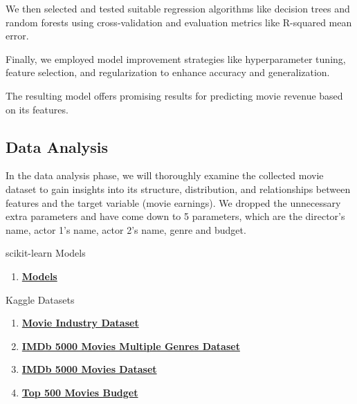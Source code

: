 \documentclass[conference]{IEEEtran}
\begin{document}
    We then selected and tested suitable regression algorithms like decision trees and random forests using cross-validation and evaluation metrics like R-squared mean error.

    Finally, we employed model improvement strategies like hyperparameter tuning, feature selection, and regularization to enhance accuracy and generalization.

    The resulting model offers promising results for predicting movie revenue based on its features.

    \subsection{Data Analysis}
    In the data analysis phase, we will thoroughly examine the collected movie dataset to gain insights into its structure, distribution, and relationships between features and the target variable (movie earnings). We dropped the unnecessary extra parameters and have come down to 5 parameters, which are the director's name, actor 1's name, actor 2's name, genre and budget.

\begin{thebibliography}{1}
     scikit-learn Models
    \begin{enumerate}
        \item \href{https://scikit-learn.org/stable/supervised_learning.html#supervised-learning}{\textbf{Models}}
    \end{enumerate}

     Kaggle Datasets
    \begin{enumerate}
        \item \href{https://www.kaggle.com/datasets/danielgrijalvas/movies}{\textbf{Movie Industry Dataset}}
        \item \href{https://www.kaggle.com/datasets/rakkesharv/imdb-5000-movies-multiple-genres-dataset}{\textbf{IMDb 5000 Movies Multiple Genres Dataset}}
        \item \href{https://www.kaggle.com/datasets/carolzhangdc/imdb-5000-movie-dataset}{\textbf{IMDb 5000 Movies Dataset}}
        \item \href{https://www.kaggle.com/datasets/mitchellharrison/top-500-movies-budget}{\textbf{Top 500 Movies Budget}}
    \end{enumerate}
\end{thebibliography}
\end{document}
